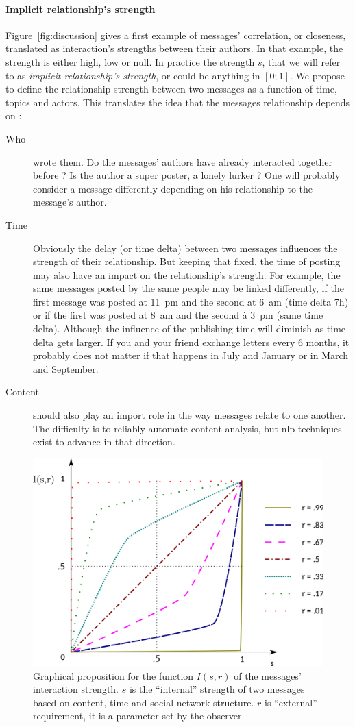 \documentclass[a4paper,twoside]{article}
\begin{document}
\paragraph{Implicit relationship's strength}
Figure~\ref{fig:discussion} gives a first example of messages' correlation, or closeness, translated as interaction's strengths between their authors.  In that example, the strength is either high, low or null.  In practice the strength $s$, that we will refer to as \emph{implicit relationship's strength}, or could be anything in $[0;1]$.
We propose to define the relationship strength between two messages as a function of time, topics and actors.  This translates the idea that the messages relationship depends on :
\begin{description}
\item[{Who}] wrote them.  Do the messages' authors have already interacted together before ?  Is the author a super poster, a lonely lurker ? One will probably consider a message differently depending on his relationship to the message's author.
\item[{Time}] Obviously the delay (or time delta) between two messages influences the strength of their relationship.  But keeping that fixed, the time of posting may also have an impact on the relationship's strength.  For example, the same messages posted by the same people may be linked differently, if the first message was posted at 11~pm and the second at 6~am (time delta 7h) or if the first was posted at 8~am and the second à 3~pm (same time delta).  Although the influence of the publishing time will diminish as time delta gets larger.  If you and your friend exchange letters every 6 months, it probably does not matter if that happens in July and January or in March and September.
\item[{Content}] should also play an import role in the way messages relate to one another.  The difficulty is to reliably automate content analysis, but \gls{nlp} techniques exist to advance in that direction.
  
\end{description}
\begin{figure}[b]
  \small{
    \caption{\label{fig:func} Graphical proposition for the function  $I(s,r)$ of the messages' interaction strength. $s$ is the ``internal'' strength of two messages based on content, time and social network structure.  $r$ is ``external'' requirement, it is a parameter set by the observer.
    }}
  \includegraphics[width=.5\textwidth]{images/func.png}
\end{figure}
\end{document}
